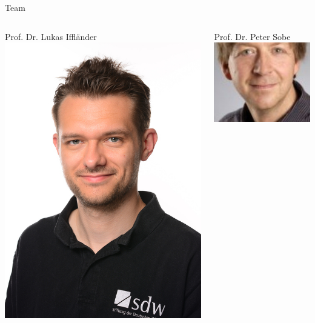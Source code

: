 \documentclass[xelatex,aspectratio=168]{beamer}
\begin{document}
\begin{frame}{Team}
  \begin{columns}
    \begin{column}{.3\textwidth}
      \begin{block}{Prof. Dr. Lukas Iffländer}
        \centering\includegraphics[height=.55\textheight]{img/portrait.jpg}
      \end{block}
    \end{column}
    \begin{column}{.35\textwidth}
      \begin{block}{Prof. Dr. Peter Sobe}
        \centering\includegraphics[height=.55\textheight]{img/sobe.jpg}

\end{block}
\end{column}
\end{columns}
\end{frame}
\end{document}
